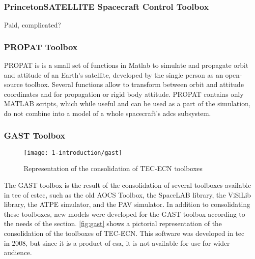 
    \subsubsection{PrincetonSATELLITE Spacecraft Control Toolbox}
    Paid, complicated?

    \subsubsection{PROPAT Toolbox}
        PROPAT is is a small set of functions in Matlab to simulate and propagate orbit and attitude of an Earth's satellite, developed by the single person as an open-source toolbox. Several functions allow to transform between orbit and attitude coordinates and for propagation or rigid body attitude. PROPAT contains only MATLAB scripts, which while useful and can be used as a part of the simulation, do not combine into a model of a whole spacecraft's \ac{adcs} subsystem.

    \subsubsection{GAST Toolbox}
        
    \begin{figure}[hb]
        \centering
        \texttt{[image: 1-introduction/gast]}
        \caption{Representation of the consolidation of TEC-ECN toolboxes}
        \label{fig:gast}
    \end{figure}
        The GAST toolbox is the result of the consolidation of several toolboxes available in \ac{tec} of \ac{estec}, such as the old AOCS Toolbox, the SpaceLAB library, the ViSiLib library, the ATPE simulator, and the PAV simulator. In addition to consolidating these toolboxes, new models were developed for the GAST toolbox according to the needs of the section. \autoref{fig:gast} shows a pictorial representation of the consolidation of the toolboxes of TEC-ECN. This software was developed in \ac{tec} in 2008, but since it is a product of \ac{esa}, it is not available for use for wider audience.


